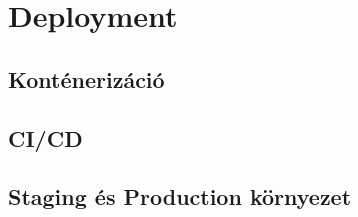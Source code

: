 \chapter{Deployment}

\section{Konténerizáció}

\section{CI/CD}

\section{Staging és Production környezet}

